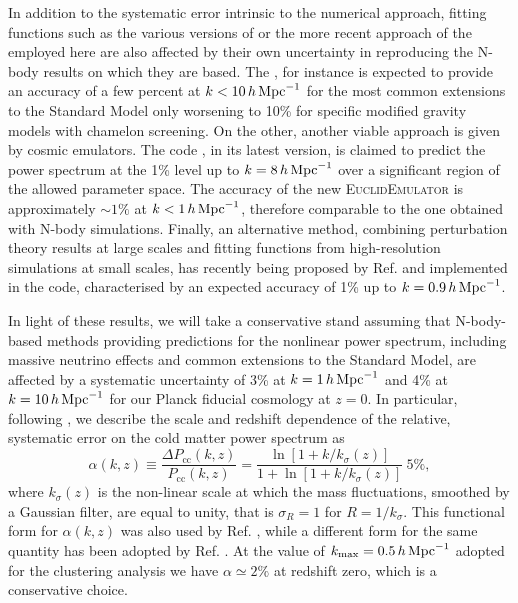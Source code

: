 \documentclass[a4paper,11pt]{article}
\newcommand{\be}{\begin{equation}}
\newcommand{\ee}{\end{equation}}
\def\halofit{{\sc{Halofit}}\xspace}
\def\hmcode{{\sc{HMCODE}}\xspace}
\def\cosmicemu{{\sc{CosmicEMU}}\xspace}
\def\NGhalofit{{\sc{NGenHalofit}}\xspace}
\def\kMpc{\, h \, {\rm Mpc}^{-1}}
\begin{document}
In addition to the systematic error intrinsic to the numerical approach, fitting functions such as the various versions of \halofit \cite{Halofit-Smith+03,Takahashi+12,Bird-HALOFIT+12} or the more recent approach of the  \hmcode \cite{Mead-nu+16} employed here are also affected by their own uncertainty in reproducing the N-body results on which they are based. The \hmcode, for instance is expected to provide an accuracy of a few percent at $k<10\kMpc$ for the most common extensions to the Standard Model only worsening to 10\% for specific modified gravity models with chamelon screening. On the other, another viable approach is given by cosmic emulators.  The \cosmicemu code \cite{CoyoteI, CoyoteII, CoyoteIII, Cosmic_emu+10}, in its latest version, is claimed to predict the power spectrum at the 1\% level up to $k=8\kMpc$ over a significant region of the allowed parameter space.
The accuracy of the new \textsc{EuclidEmulator} \cite{EuclidEmulator} is approximately $\sim 1 \%$  at $k< 1 \kMpc$, therefore comparable to the one obtained with N-body simulations.
Finally, an alternative method, combining perturbation theory results at large scales and fitting functions from high-resolution simulations at small scales, has recently being proposed by Ref. \cite{Smith-Angulo+18} and implemented in the \NGhalofit code, characterised by an expected accuracy of 1\% up to $k=0.9\kMpc$.

In light of these results, we will take a conservative stand assuming that N-body-based methods providing predictions for the nonlinear power spectrum, including massive neutrino effects and common extensions to the Standard Model, are affected by a systematic uncertainty of 3\% at $k=1\kMpc$ and 4\% at $k=10\kMpc$ for our Planck fiducial cosmology at $z=0$. In particular, following \cite{Bird-HALOFIT+12}, we describe the scale and redshift dependence of the relative, systematic error on the cold matter power spectrum as
\be
\alpha(k,z) \equiv \frac{\Delta P_\mathrm{cc}(k,z)}{P_\mathrm{cc}(k,z)} = \frac{\ln[1+k/k_\sigma(z)]}{1+\ln[1+k/k_\sigma(z)]} \ 5\%,
\label{eq:halofit_error}
\ee
where $k_{\sigma}(z)$ is the non-linear scale at which the mass fluctuations, smoothed by a Gaussian filter, are equal to unity, that is $\sigma_R=1$ for $R=1/k_\sigma$. This functional form for $\alpha(k,z)$ was also used by Ref. \cite{Audren+12}, while a different form for the same quantity has been adopted by Ref. \cite{Sprenger+18}.
At the value of $k_\textrm{max}=0.5\kMpc$ adopted for the clustering analysis we have $\alpha\simeq 2\%$ at redshift zero,  which is a conservative choice.  
\end{document}
